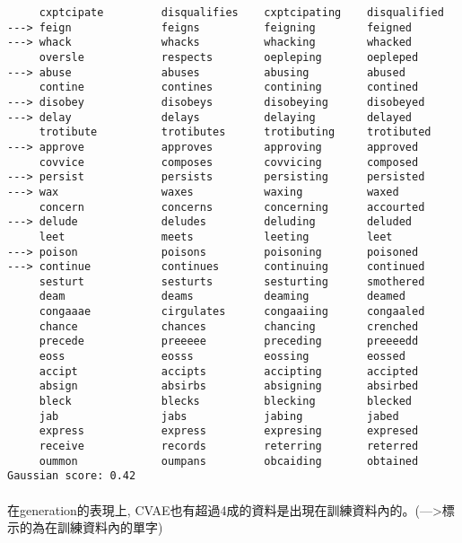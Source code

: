 \begin{lstlisting}
     cxptcipate     	disqualifies   	cxptcipating   	disqualified   	
---> feign          	feigns         	feigning       	feigned        	
---> whack          	whacks         	whacking       	whacked        	
     oversle        	respects       	oepleping      	oepleped       	
---> abuse          	abuses         	abusing        	abused         	
     contine        	contines       	contining      	contined       	
---> disobey        	disobeys       	disobeying     	disobeyed      	
---> delay          	delays         	delaying       	delayed        	
     trotibute      	trotibutes     	trotibuting    	trotibuted     	
---> approve        	approves       	approving      	approved       	
     covvice        	composes       	covvicing      	composed       	
---> persist        	persists       	persisting     	persisted      	
---> wax            	waxes          	waxing         	waxed          	
     concern        	concerns       	concerning     	accourted      	
---> delude         	deludes        	deluding       	deluded        	
     leet           	meets          	leeting        	leet           	
---> poison         	poisons        	poisoning      	poisoned       	
---> continue       	continues      	continuing     	continued      	
     sesturt        	sesturts       	sesturting     	smothered      	
     deam           	deams          	deaming        	deamed         	
     congaaae       	cirgulates     	congaaiing     	congaaled      	
     chance         	chances        	chancing       	crenched       	
     precede        	preeeee        	preceding      	preeeedd       	
     eoss           	eosss          	eossing        	eossed         	
     accipt         	accipts        	accipting      	accipted       	
     absign         	absirbs        	absigning      	absirbed       	
     bleck          	blecks         	blecking       	blecked        	
     jab            	jabs           	jabing         	jabed          	
     express        	express        	expresing      	expresed       	
     receive        	records        	reterring      	reterred       	
     oummon         	oumpans        	obcaiding      	obtained       	
Gaussian score: 0.42
\end{lstlisting}
\paragraph{}
在generation的表現上, CVAE也有超過4成的資料是出現在訓練資料內的。(--->標示的為在訓練資料內的單字)
